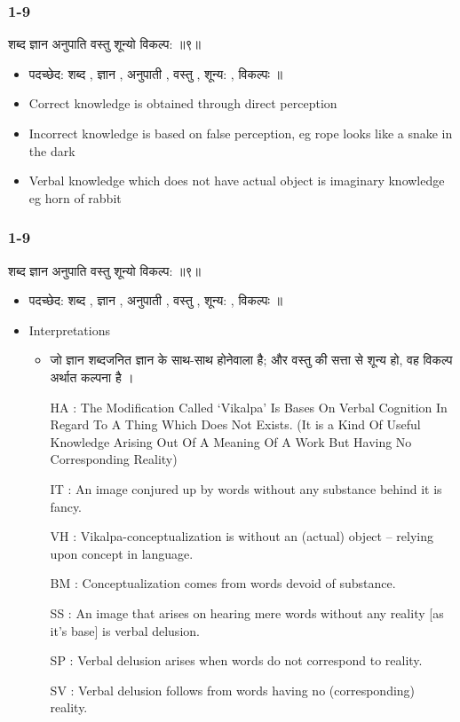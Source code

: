 \begin{frame}[fragile]\frametitle{1-9}

\begin{sanskrit}
शब्द ज्ञान अनुपाति वस्तु शून्यो विकल्प: ॥९॥
\end{sanskrit}


	\begin{itemize}
	\item पदच्छेद: शब्द , ज्ञान , अनुपाती , वस्तु , शून्य: , विकल्पः ॥
	\item Correct knowledge is obtained through direct perception
	\item Incorrect knowledge is based on false perception, eg rope looks like a snake in the dark
	\item Verbal knowledge which does not have actual object is imaginary knowledge eg horn of rabbit
	\end{itemize}

\end{frame}

\begin{frame}[fragile]\frametitle{1-9}

\begin{sanskrit}
शब्द ज्ञान अनुपाति वस्तु शून्यो विकल्प: ॥९॥
\end{sanskrit}


	\begin{itemize}
	\item पदच्छेद: शब्द , ज्ञान , अनुपाती , वस्तु , शून्य: , विकल्पः ॥
	\item Interpretations
		\begin{itemize}		
		\item जो ज्ञान शब्दजनित ज्ञान के साथ-साथ होनेवाला है; और वस्तु की सत्ता से शून्य हो, वह विकल्प अर्थात कल्पना है ।
		\item [HA]: The Modification Called ‘Vikalpa’ Is Bases On Verbal Cognition In Regard To A Thing Which Does Not Exists. (It is a Kind Of Useful Knowledge Arising Out Of A Meaning Of A Work But Having No Corresponding Reality)
		\item [IT]: An image conjured up by words without any substance behind it is fancy.
		\item [VH]: Vikalpa-conceptualization is without an (actual) object – relying upon concept in language.
		\item [BM]: Conceptualization comes from words devoid of substance.
		\item [SS]: An image that arises on hearing mere words without any reality [as it’s base] is verbal delusion.
		\item [SP]: Verbal delusion arises when words do not correspond to reality.
		\item [SV]: Verbal delusion follows from words having no (corresponding) reality.
		\end{itemize}
	\end{itemize}

\end{frame}

